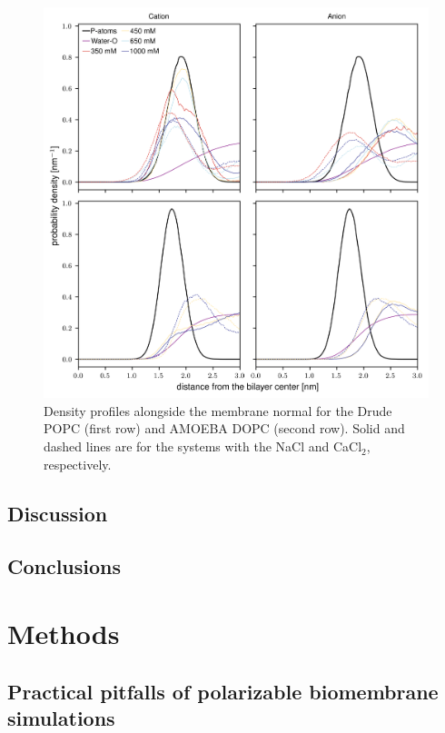 \documentclass[journal=jacsat,manuscript=article,layout=singlecolumn]{achemso}
\begin{document}
\begin{figure}[!hbt]
    \centering
    \includegraphics{Figures/ion_density_profiles_with_chloride.png}
    \caption{Density profiles alongside the membrane normal for the Drude POPC (first row) and AMOEBA DOPC (second row). Solid and dashed lines are for the systems with the NaCl and CaCl$_{2}$, respectively.}
    \label{fig:ion_density_profiles}
\end{figure}


\clearpage

\subsection{Discussion}

\subsection{Conclusions}


\section{Methods}
\subsection{Practical pitfalls of polarizable biomembrane simulations}
\end{document}
